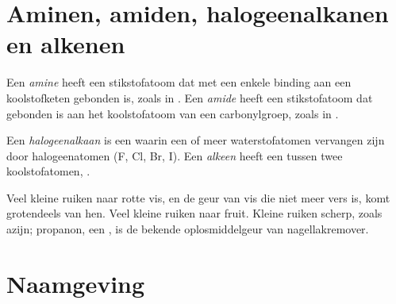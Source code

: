\section{Aminen, amiden, halogeenalkanen en alkenen}


\begin{definition}\label{def:g11:functional-groups:amine}
Een \emph{amine} heeft een stikstofatoom dat met een enkele
binding aan een koolstofketen gebonden is, zoals in . Een
\emph{amide} heeft een stikstofatoom dat gebonden is aan het
koolstofatoom van een carbonylgroep, zoals in .
\end{definition}

\begin{definition}\label{def:g11:functional-groups:halogenoalkane}
Een \emph{halogeenalkaan} is een  waarin een
of meer waterstofatomen vervangen zijn door halogeenatomen (F, Cl, Br,
I). Een \emph{alkeen} heeft een  tussen twee
koolstofatomen, .
\end{definition}

\begin{remark}\label{rem:g11:functional-groups:smells}
Veel kleine  ruiken naar rotte vis, en de geur van vis die niet
meer vers is, komt grotendeels van hen. Veel kleine  ruiken naar
fruit. Kleine  ruiken scherp, zoals azijn; propanon, een
, is de bekende oplosmiddelgeur van nagellakremover.
\end{remark}

\section{Naamgeving}

